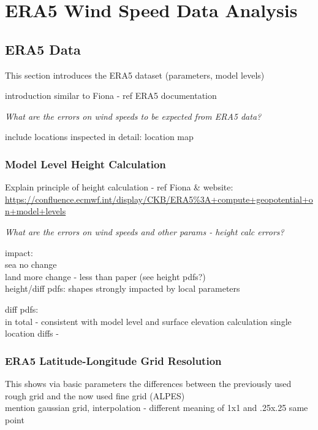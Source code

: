 
\chapter{ERA5 Wind Speed Data Analysis}
\label{sec:era5-data}
\section{ERA5 Data}
This section introduces the ERA5 dataset (parameters, model levels)

introduction similar to Fiona - ref ERA5 documentation

\textit{What are the errors on wind speeds to be expected from ERA5 data?}

include locations inspected in detail: location map

\subsection{Model Level Height Calculation}
Explain principle of height calculation - ref Fiona \& website:  \url{https://confluence.ecmwf.int/display/CKB/ERA5%3A+compute+geopotential+on+model+levels}

\textit{What are the errors on wind speeds and other params - height calc errors?}

impact:\\
sea no change\\ 
land more change - less than paper (see height pdfs?)\\

height/diff pdfs: shapes strongly impacted by local parameters

diff pdfs:\\
in total - consistent with model level and surface elevation calculation
single location diffs - 

\subsection{ERA5 Latitude-Longitude Grid Resolution}
This shows via basic parameters the differences between the previously used rough grid and the now used fine grid (ALPES)\\
mention gaussian grid, interpolation - different meaning of 1x1 and .25x.25 same point

